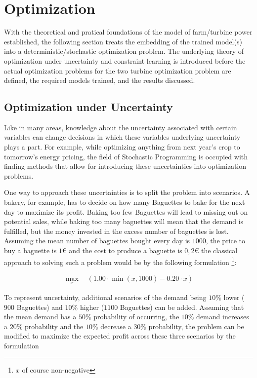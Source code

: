 \chapter{Optimization}\label{section:optimization}

With the theoretical and pratical foundations of the model of farm/turbine power established, the following section treats the embedding of the trained model(s)  into a deterministic/stochastic optimization problem. The underlying theory of optimization under uncertainty and constraint learning is introduced before the actual optimization problems for the two turbine optimization problem are defined, the required models trained, and the results discussed.


\section{Optimization under Uncertainty}

Like in many areas, knowledge about the uncertainty associated with certain variables can change decisions in which these variables underlying uncertainty plays a part. For example, while optimizing anything from next year's crop to tomorrow's energy pricing, the field of Stochastic Programming is occupied with finding methods that allow for introducing these uncertainties into optimization problems.

One way to approach these uncertainties is to split the problem into scenarios. A bakery, for example, has to decide on how many Baguettes to bake for the next day to maximize its profit. Baking too few Baguettes will lead to missing out on potential sales, while baking too many baguettes will mean that the demand is fulfilled, but the money invested in the excess number of baguettes is lost. Assuming the mean number of baguettes bought every day is $1000$, the price to buy a baguette is $1 €$ and the cost to produce a baguette is $0,2 €$ the classical approach to solving such a problem would be by the following formulation \footnote{$x$ of course non-negative}: 


\begin{align*}
	\max_{x} \quad \left( 1.00 \cdot \min(x,1000) - 0.20 \cdot x \right)
\end{align*}


To represent uncertainty, additional scenarios of the demand being $10\%$ lower ($900$ Baguettes) and $10\%$ higher ($1100$ Baguettes) can be added. Assuming that the mean demand has a $50\%$ probability of occurring, the $10\%$ demand increases a $20\%$ probability and the $10\%$ decrease a $30\%$  probability, the problem can be modified to maximize the expected profit across these three scenarios by the formulation

